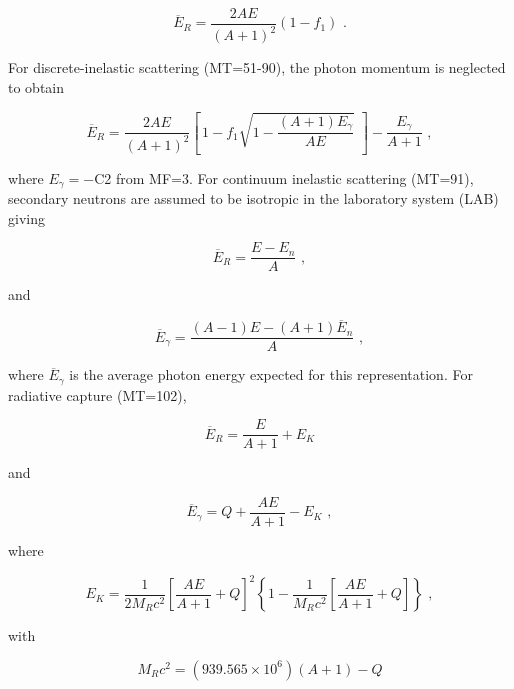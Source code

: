 \begin{equation}
   \overline{E}_R=\frac{2AE}{(A+1)^2}(1-f_1)\,\,.
\end{equation}

For discrete-inelastic scattering (MT=51-90), the photon
momentum is neglected to obtain

\begin{equation}
   \overline{E}_R=\frac{2AE}{(A+1)^2}\left[\,1-
    f_1\sqrt{1-\frac{(A+1)E_\gamma}{AE}}\,\,\right]
    -\frac{E_\gamma}{A+1}\,\,,
\label{disc}
\end{equation}

\noindent
where $E_\gamma{=}-$C2 from MF=3.  For continuum inelastic
scattering (MT=91), secondary neutrons are assumed to be
isotropic in the laboratory system (LAB) giving

\begin{equation}
   \overline{E}_R=\frac{E-E_n}{A}\,\,,
\label{contin}
\end{equation}

\noindent
and

\begin{equation}
   \overline{E}_\gamma=
     \frac{(A-1)E-(A+1)\overline{E}_n}{A}\,\,,
\label{contin2}
\end{equation}
\vspace{0.5 pt}

\noindent
where $\overline{E}_\gamma$ is the average photon energy
expected for this representation.  For radiative capture (MT=102),

\begin{equation}
   \overline{E}_R=\frac{E}{A+1}+E_K
\end{equation}

\noindent
and

\begin{equation}
   \overline{E}_\gamma=Q+\frac{AE}{A+1}-E_K\,\,,
\end{equation}

\noindent
where

\begin{equation}
   E_K=\frac{1}{2M_Rc^2}\left[\frac{AE}{A+1}+Q\right]^2
     \left\{1-\frac{1}{M_Rc^2}\left[
       \frac{AE}{A+1}+Q\right]\right\}\,\,,
\end{equation}

\noindent
with

\noindent
\begin{equation}
   M_Rc^2=(939.565\times 10^6)(A+1)-Q
\end{equation}

